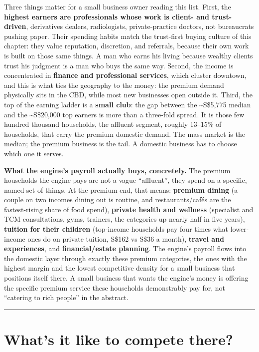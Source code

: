 \documentclass[10pt,twoside,openany]{memoir}
\begin{document}
{{{{{{{Three things matter for a small business owner reading this list. First,
the \textbf{highest earners are professionals whose work is client- and
trust-driven}, derivatives dealers, radiologists, private-practice
doctors, not bureaucrats pushing paper. Their spending habits match the
trust-first buying culture of this chapter: they value reputation,
discretion, and referrals, because their own work is built on those same
things. A man who earns his living because wealthy clients trust his
judgment is a man who buys the same way. Second, the income is
concentrated in \textbf{finance and professional services}, which
cluster downtown, and this is what ties the geography to the money: the
premium demand physically sits in the CBD, while most new businesses
open outside it. Third, the top of the earning ladder is a \textbf{small
club}: the gap between the \textasciitilde S\$5,775 median and the
\textasciitilde S\$20,000 top earners is more than a three-fold spread.
It is those few hundred thousand households, the affluent segment,
roughly 13--15\% of households, that carry the premium domestic demand.
The mass market is the median; the premium business is the tail. A
domestic business has to choose which one it serves.

\textbf{What the engine's payroll actually buys, concretely.} The
premium households the engine pays are not a vague ``affluent'', they
spend on a specific, named set of things. At the premium end, that
means: \textbf{premium dining} (a couple on two incomes dining out is
routine, and restaurants/cafés are the fastest-rising share of food
spend), \textbf{private health and wellness} (specialist and TCM
consultations, gyms, trainers, the categories up nearly half in five
years), \textbf{tuition for their children} (top-income households pay
four times what lower-income ones do on private tuition, S\$162 vs S\$36
a month), \textbf{travel and experiences}, and \textbf{financial/estate
planning}. The engine's payroll flows into the domestic layer through
exactly these premium categories, the ones with the highest margin and
the lowest competitive density for a small business that positions
itself there. A small business that wants the engine's money is offering
the specific premium service these households demonstrably pay for, not
``catering to rich people'' in the abstract.

\begin{center}\rule{0.5\linewidth}{0.5pt}\end{center}

\FloatBarrier
\chapter{What's it like to compete
there?}\label{whats-it-like-to-compete-there}

}}}}}}}
\end{document}

